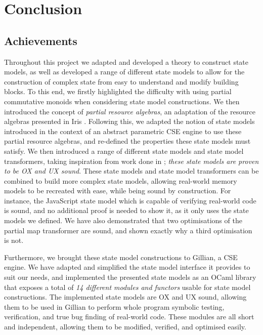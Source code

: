 \chapter{Conclusion} \label{chap:conclusion}

\section{Achievements}

Throughout this project we adapted and developed a theory to construct state models, as well as developed a range of different state models to allow for the construction of complex state from easy to understand and modify building blocks. To this end, we firstly highlighted the difficulty with using partial commutative monoids when considering state model constructions. We then introduced the concept of \emph{partial resource algebras}, an adaptation of the resource algebras presented in Iris \cite{iris}. Following this, we adapted the notion of state models introduced in the context of an abstract parametric CSE engine \cite{cse2} to use these partial resource algebras, and re-defined the properties these state models must satisfy. We then introduced a range of different state models and state model transformers, taking inspiration from work done in \cite{iris,sacha-phd}; \emph{these state models are proven to be OX and UX sound}. These state models and state model transformers can be combined to build more complex state models, allowing real-world memory models to be recreated with ease, while being sound by construction. For instance, the JavaScript state model which is capable of verifying real-world code is sound, and no additional proof is needed to show it, as it only uses the state models we defined. We have also demonstrated that two optimisations of the partial map transformer are sound, and shown exactly why a third optimisation is not.

Furthermore, we brought these state model constructions to Gillian, a CSE engine. We have adapted and simplified the state model interface it provides to suit our needs, and implemented the presented state models as an OCaml library that exposes a total of \emph{14 different modules and functors} usable for state model constructions. The implemented state models are OX and UX sound, allowing them to be used in Gillian to perform whole program symbolic testing, verification, and true bug finding of real-world code. These modules are all short and independent, allowing them to be modified, verified, and optimised easily.

